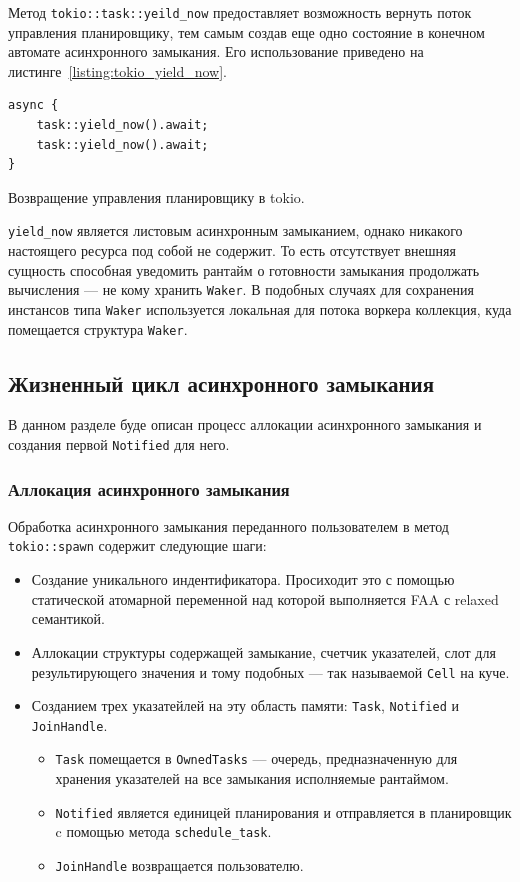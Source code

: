 Метод \verb|tokio::task::yeild_now| предоставляет возможность вернуть поток управления планировщику, тем самым создав еще одно состояние в конечном автомате асинхронного замыкания. Его использование приведено на листинге~\ref{listing:tokio_yield_now}.

\begin{listing}[H]
    \begin{verbatim}
async {
    task::yield_now().await;
    task::yield_now().await;
}
    \end{verbatim}

    \caption{Возвращение управления планировщику в tokio.}
    \label{listing:tokio_yield_now}
\end{listing}

\verb|yield_now| является листовым асинхронным замыканием, однако никакого настоящего ресурса под собой не содержит. То есть отсутствует внешняя сущность способная уведомить рантайм о готовности замыкания продолжать вычисления --- не кому хранить \verb|Waker|. В подобных случаях для сохранения инстансов типа \verb|Waker| используется локальная для потока воркера коллекция, куда помещается структура \verb|Waker|.

\subsection{Жизненный цикл асинхронного замыкания}

В данном разделе буде описан процесс аллокации асинхронного замыкания и создания первой \verb|Notified| для него.

\subsubsection{Аллокация асинхронного замыкания}

Обработка асинхронного замыкания переданного пользователем в метод \verb|tokio::spawn| содержит следующие шаги:

\begin{itemize}
    \item Создание уникального индентификатора. Просиходит это с помощью статической атомарной переменной над которой выполняется FAA с relaxed семантикой.
    \item Аллокации структуры содержащей замыкание, счетчик указателей, слот для результирующего значения и тому подобных --- так называемой \verb|Cell| на куче.
    \item Созданием трех указатейлей на эту область памяти: \verb|Task|, \verb|Notified| и \verb|JoinHandle|.
    \begin{itemize}
        \item \verb|Task| помещается в \verb|OwnedTasks| --- очередь, предназначенную для хранения указателей на все замыкания исполняемые рантаймом.
        \item \verb|Notified| является единицей планирования и отправляется в планировщик c помощью метода \verb|schedule_task|.
        \item \verb|JoinHandle| возвращается пользователю.
    \end{itemize}
\end{itemize}

